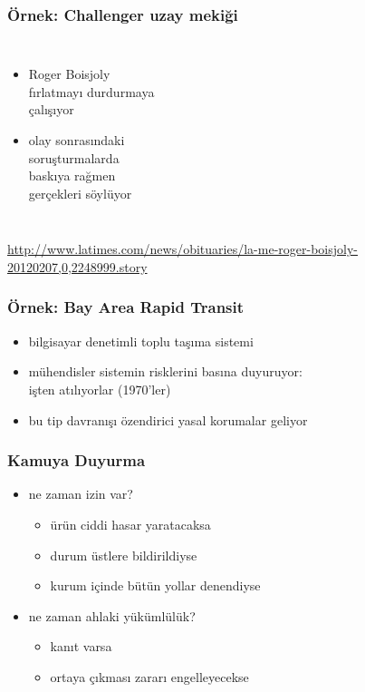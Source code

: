 \documentclass[dvipsnames]{beamer}
\theoremstyle{definition}
\theoremstyle{example}
\theoremstyle{plain}
\begin{document}
\begin{frame}
  \frametitle{Örnek: Challenger uzay mekiği}

  \begin{columns}

    \begin{itemize}
      \item Roger Boisjoly\\
        fırlatmayı durdurmaya\\
        çalışıyor
      \item olay sonrasındaki\\
        soruşturmalarda\\
        baskıya rağmen\\
        gerçekleri söylüyor
    \end{itemize}
  \end{columns}

  \medskip
  \tiny{\url{http://www.latimes.com/news/obituaries/la-me-roger-boisjoly-20120207,0,2248999.story}}\\
\end{frame}

\begin{frame}
  \frametitle{Örnek: Bay Area Rapid Transit}

  \begin{itemize}
    \item bilgisayar denetimli toplu taşıma sistemi
    \item mühendisler sistemin risklerini basına duyuruyor:\\
      işten atılıyorlar (1970'ler)

    \medskip
    \item bu tip davranışı özendirici yasal korumalar geliyor
  \end{itemize}
\end{frame}

\begin{frame}
  \frametitle{Kamuya Duyurma}

  \begin{itemize}
    \item ne zaman izin var?
    \begin{itemize}
      \item ürün ciddi hasar yaratacaksa
      \item durum üstlere bildirildiyse
      \item kurum içinde bütün yollar denendiyse
    \end{itemize}

    \pause
    \medskip
    \item ne zaman ahlaki yükümlülük?
    \begin{itemize}
      \item kanıt varsa
      \item ortaya çıkması zararı engelleyecekse
    \end{itemize}
  \end{itemize}
\end{frame}
\end{document}
